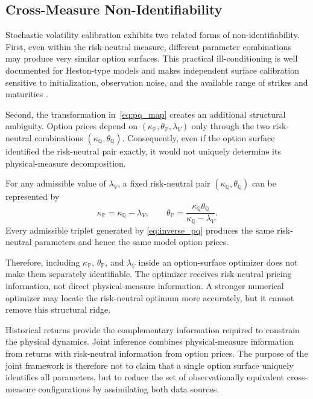 \documentclass[sigconf,anonymous,review]{acmart}
\begin{document}
\subsection{Cross-Measure Non-Identifiability}
\label{sec:nonidentifiability}

Stochastic volatility calibration exhibits two related forms of non-identifiability. First, even within the risk-neutral measure, different parameter combinations may produce very similar option surfaces. This practical ill-conditioning is well documented for Heston-type models and makes independent surface calibration sensitive to initialization, observation noise, and the available range of strikes and maturities \cite{gatheral2006,cui2017full,mrazek2017calibration}.

Second, the transformation in~\eqref{eq:pq_map} creates an additional structural ambiguity. Option prices depend on
$\left(
\kappa_{\mathbb{P}},
\theta_{\mathbb{P}},
\lambda_V
\right)$ only through the two risk-neutral combinations
 $\left(
\kappa_{\mathbb{Q}},
\theta_{\mathbb{Q}}
\right).$
Consequently, even if the option surface identified the risk-neutral pair exactly, it would not uniquely determine its physical-measure decomposition.

For any admissible value of \(\lambda_V\), a fixed risk-neutral pair \(\left(\kappa_{\mathbb{Q}},\theta_{\mathbb{Q}}\right)\) can be represented by
%
\begin{equation}
\kappa_{\mathbb{P}}
=
\kappa_{\mathbb{Q}}-\lambda_V,
\qquad
\theta_{\mathbb{P}}
=
\frac{\kappa_{\mathbb{Q}}\theta_{\mathbb{Q}}}
{\kappa_{\mathbb{Q}}-\lambda_V}.
\label{eq:inverse_pq}
\end{equation}
%
Every admissible triplet generated by \eqref{eq:inverse_pq} produces the same risk-neutral parameters and hence the same model option prices.

Therefore, including \(\kappa_{\mathbb{P}}\), \(\theta_{\mathbb{P}}\), and \(\lambda_V\) inside an option-surface optimizer does not make them separately identifiable. The optimizer receives risk-neutral pricing information, not direct physical-measure information. A stronger numerical optimizer may locate the risk-neutral optimum more accurately, but it cannot remove this structural ridge.

Historical returns provide the complementary information required to constrain the physical dynamics. Joint inference combines physical-measure information from returns with
risk-neutral information from option prices.
The purpose of the joint framework is therefore not to claim that a single option surface uniquely identifies all parameters, but to reduce the set of observationally equivalent cross-measure configurations by assimilating both data sources.
\end{document}
